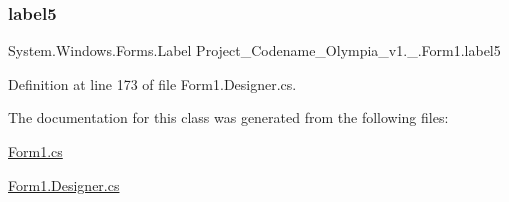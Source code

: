 \subsubsection{\texorpdfstring{label5}{label5}}
{\footnotesize\ttfamily System.\+Windows.\+Forms.\+Label Project\+\_\+\+Codename\+\_\+\+Olympia\+\_\+v1.\+\_.\+Form1.\+label5\hspace{0.3cm}{\ttfamily [private]}}



Definition at line 173 of file Form1.\+Designer.\+cs.



The documentation for this class was generated from the following files\+:\begin{DoxyCompactItemize}
\item 
\hyperlink{Form1_8cs}{Form1.\+cs}\item 
\hyperlink{Form1_8Designer_8cs}{Form1.\+Designer.\+cs}\end{DoxyCompactItemize}
